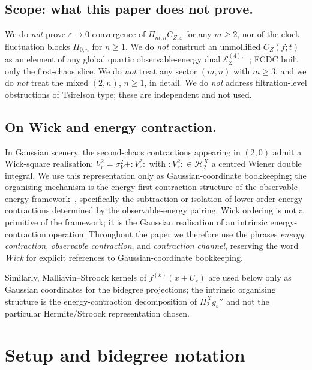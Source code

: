 \documentclass[11pt,reqno]{amsart}
\theoremstyle{plain}
\theoremstyle{definition}
\theoremstyle{remark}
\newcommand{\Hilb}{\mathcal{H}}
\newcommand{\Energy}{\mathcal{E}}
\newcommand{\IBM}{Z}
\newcommand{\Pir}{\Pi}
\begin{document}
\subsection*{Scope: what this paper does not prove.}\label{sec:scope}
We do \emph{not} prove $\varepsilon\to 0$ convergence of
$\Pir_{m,n}C_{\IBM,\varepsilon}$ for any $m\ge 2$, nor of the
clock-fluctuation blocks $\Pir_{0,n}$ for $n\ge 1$. We do \emph{not}
construct an unmollified $C_\IBM(f;t)$ as an element of any global
quartic observable-energy dual $\Energy_\IBM^{(4),-}$; FCDC built
only the first-chaos slice. We do \emph{not} treat any sector
$(m,n)$ with $m\ge 3$, and we do \emph{not} treat the mixed
$(2,n)$, $n\ge 1$, in detail. We do \emph{not} address
filtration-level obstructions of Tsirelson type; these are
independent and not used.

\subsection*{On Wick and energy contraction.}\label{sec:wick}
In Gaussian scenery, the second-chaos contractions appearing in
$(2,0)$ admit a Wick-square realisation: $V_r^2=\sigma_V^2+:V_r^2:$
with $:V_r^2:\in\Hilb_2^X$ a centred Wiener double integral. We use
this representation only as Gaussian-coordinate bookkeeping; the
organising mechanism is the energy-first contraction structure of
the observable-energy framework~\cite{Fontes-EnergyFirst},
specifically the subtraction or isolation of lower-order energy
contractions determined by the observable-energy pairing. Wick
ordering is not a primitive of the framework; it is the Gaussian
realisation of an intrinsic energy-contraction operation. Throughout
the paper we therefore use the phrases \emph{energy contraction},
\emph{observable contraction}, and \emph{contraction channel},
reserving the word \emph{Wick} for explicit references to
Gaussian-coordinate bookkeeping.

Similarly, Malliavin--Stroock kernels of $f^{(k)}(x+U_r)$ are used
below only as Gaussian coordinates for the bidegree projections; the
intrinsic organising structure is the energy-contraction
decomposition of $\Pir_2^X g_\varepsilon''$ and not the particular
Hermite/Stroock representation chosen.

\section{Setup and bidegree notation}\label{sec:setup}
\end{document}
